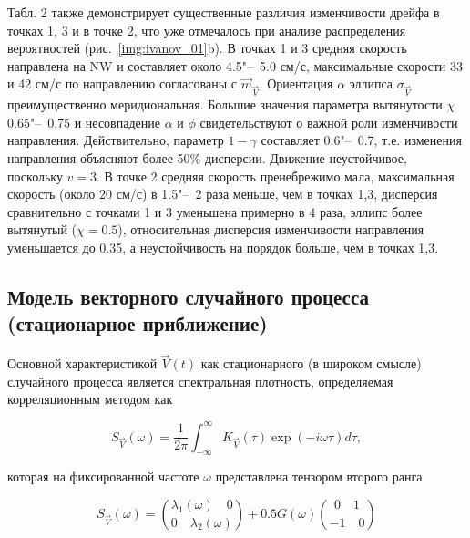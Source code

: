 Табл. 2 также  демонстрирует существенные различия изменчивости дрейфа в точках 1, 3 и в точке 2, что уже отмечалось при анализе распределения вероятностей (рис.~\ref{img:ivanov_01}b). В точках 1 и 3 средняя скорость направлена на NW и составляет около 4.5"--~5.0 см/с, максимальные скорости 33 и 42 см/с по направлению согласованы с $\vec{m}_{\vec{V}}$. Ориентация $\alpha$ эллипса $\sigma_{\vec{V}}$ преимущественно меридиональная. Большие значения параметра вытянутости $\chi$ 0.65"--~0.75 и несовпадение $\alpha$ и $\phi$ свидетельствуют о важной роли изменчивости направления. Действительно, параметр $1-\gamma$ составляет 0.6"--~0.7, т.е. изменения направления объясняют более 50$\%$ дисперсии. Движение неустойчивое, поскольку $v=3$. В точке 2 средняя скорость пренебрежимо мала, максимальная скорость (около 20 см/с) в 1.5"--~2 раза меньше, чем в точках 1,3, дисперсия сравнительно с точками 1 и 3 уменьшена примерно в 4 раза, эллипс более вытянутый ($\chi=0.5$), относительная дисперсия изменчивости направления уменьшается до 0.35, а неустойчивость на порядок больше, чем в точках 1,3. 
 
\subsection{Модель векторного случайного процесса (стационарное приближение)}
Основной характеристикой $\vec{V}(t)$ как стационарного (в широком смысле) случайного процесса является спектральная плотность, определяемая корреляционным методом как~\cite{Belyshev1983}

\begin{equation}
\label{eq:equation3_14}
S_{\vec{V}}(\omega)=\frac{1}{2\pi}\int_{-\infty}^{\infty}{{K_{\vec{V}}(\tau)\exp(-i\omega\tau)d\tau}},
\end{equation}

которая на фиксированной частоте $\omega$ представлена тензором второго ранга

\begin{equation}
\label{eq:equation3_15}
{S_{\vec{V}}(\omega)= {{{\lambda_1}}(\omega)\quad 0 \choose 0 \quad {{\lambda_2}}(\omega)}}+0.5G(\omega){0 \quad 1 \choose -1 \quad 0}
\end{equation}

